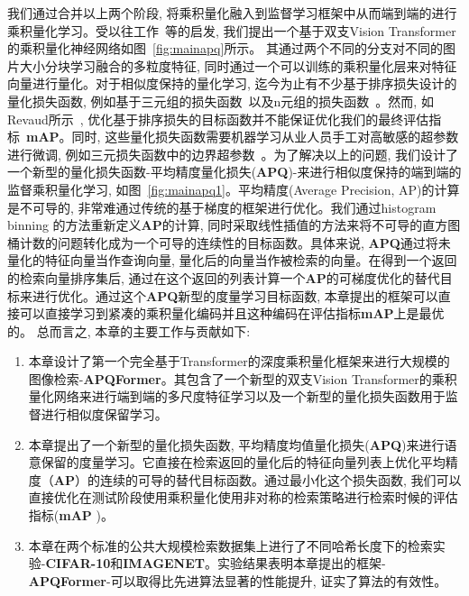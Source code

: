我们通过合并以上两个阶段, 将乘积量化融入到监督学习框架中从而端到端的进行乘积量化学习。受以往工作~\cite{jang2020generalized, yu2018product, dosovitskiy2020image, chen2021crossvit}等的启发, 我们提出一个基于双支Vision Transformer的乘积量化神经网络如图~\ref{fig:mainapq}所示。 其通过两个不同的分支对不同的图片大小分块学习融合的多粒度特征, 同时通过一个可以训练的乘积量化层来对特征向量进行量化。对于相似度保持的量化学习, 迄今为止有不少基于排序损失设计的量化损失函数, 例如基于三元组的损失函数~\cite{jegou2010product}以及n元组的损失函数~\cite{jang2020generalized}。然而, 如Revaud所示~\cite{revaud2019learning}, 优化基于排序损失的目标函数并不能保证优化我们的最终评估指标~\textbf{mAP}。同时, 这些量化损失函数需要机器学习从业人员手工对高敏感的超参数进行微调, 例如三元损失函数中的边界超参数~\cite{cakir2019deep}。为了解决以上的问题, 我们设计了一个新型的量化损失函数-平均精度量化损失(\textbf{APQ})-来进行相似度保持的端到端的监督乘积量化学习, 如图~\ref{fig:mainapq1}。平均精度(Average Precision, AP)的计算是不可导的, 非常难通过传统的基于梯度的框架进行优化。我们通过histogram binning 的方法重新定义\textbf{AP}的计算, 同时采取线性插值的方法来将不可导的直方图桶计数的问题转化成为一个可导的连续性的目标函数。具体来说, \textbf{APQ}通过将未量化的特征向量当作查询向量, 量化后的向量当作被检索的向量。在得到一个返回的检索向量排序集后, 通过在这个返回的列表计算一个\textbf{AP}的可梯度优化的替代目标来进行优化。通过这个\textbf{APQ}新型的度量学习目标函数, 本章提出的框架可以直接可以直接学习到紧凑的乘积量化编码并且这种编码在评估指标\textbf{mAP}上是最优的。 总而言之, 本章的主要工作与贡献如下:
\begin{enumerate}
    \item 本章设计了第一个完全基于Transformer的深度乘积量化框架来进行大规模的图像检索-\textbf{APQFormer}。其包含了一个新型的双支Vision Transformer的乘积量化网络来进行端到端的多尺度特征学习以及一个新型的量化损失函数用于监督进行相似度保留学习。
    \item 本章提出了一个新型的量化损失函数, 平均精度均值量化损失(\textbf{APQ})来进行语意保留的度量学习。它直接在检索返回的量化后的特征向量列表上优化平均精度（\textbf{AP}）的连续的可导的替代目标函数。通过最小化这个损失函数, 我们可以直接优化在测试阶段使用乘积量化使用非对称的检索策略进行检索时候的评估指标(\textbf{mAP} )。
    \item 本章在两个标准的公共大规模检索数据集上进行了不同哈希长度下的检索实验-\textbf{CIFAR-10}和\textbf{IMAGENET}。实验结果表明本章提出的框架-\textbf{APQFormer}-可以取得比先进算法显著的性能提升, 证实了算法的有效性。
\end{enumerate}

